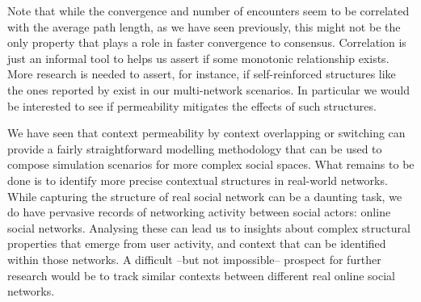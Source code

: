 \documentclass[preprint,number]{elsarticle}
\begin{document}
Note that while the convergence and number of encounters seem to be correlated with the average path length, as we have seen previously, this might not be the only property that plays a role in faster convergence to consensus. Correlation is just an informal tool to helps us assert if some monotonic relationship exists. More research is needed to assert, for instance, if self-reinforced structures like the ones reported by \cite{Villatoro2013} exist in our multi-network scenarios. In particular we would be interested to see if permeability mitigates the effects of such structures.

We have seen that context permeability by context overlapping or switching can provide a fairly straightforward modelling methodology that can be used to compose simulation scenarios for more complex social spaces. What remains to be done is to identify more precise contextual structures in real-world networks. While capturing the structure of real social network can be a daunting task, we do have pervasive records of networking activity between social actors: online social networks. Analysing these can lead us to insights about complex structural properties that emerge from user activity, and context that can be identified within those networks. A difficult --but not impossible-- prospect for further research would be to track similar contexts between different real online social networks.

\newpage
\begin{appendices}
	
\end{appendices}





\end{document}
